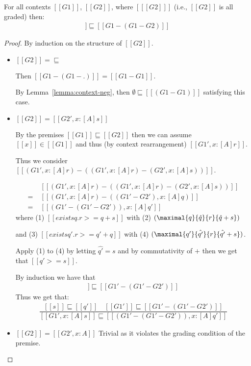 \begin{lemma}
\label{lemma:contexts-subsub}
For all contexts $[[ G1 ]]$, $[[ G2 ]]$, where
$[[ [ G2 ] ]]$ (i.e., $[[ G2 ]]$ is all graded)
then:
%
\begin{align*}
[[ G2 ]] \sqsubseteq [[ G1 - (G1 - G2) ]]
\end{align*}
\end{lemma}

\begin{proof}
By induction on the structure of $[[ G2 ]]$.

\begin{itemize}
\item $[[ G2 ]] = \sqsubseteq$

Then $[[ G1 - (G1 - .) ]] = [[ G1 - G1 ]]$.

By Lemma~\ref{lemma:context-neg}, then $ \emptyset \sqsubseteq [[ (G1 - G1) ]]$
satisfying this case.

\item $[[ G2 ]] = [[ G2', x : [A] s ]]$

By the premises $[[ G1 ]] \sqsubseteq [[ G2 ]]$ then we can
assume $[[ x ]] \in [[ G1 ]]$ and thus (by context
rearrangement) $[[ G1', x : [A] r]]$.

Thus we consider $[[ (G1', x : [A] r) - ((G1', x : [A] r) - (G2', x : [A] s)) ]]$.

\begin{align*}
  \; & [[ (G1', x : [A] r) - ((G1', x : [A] r) - (G2', x : [A] s)) ]] \\
= \; & [[ (G1', x : [A] r) - ((G1' - G2'), x : [A] q) ]] \\
= \; & [[ (G1' - (G1' - G2')), x : [A] q' ]]
\end{align*}
%
where (1) $[[ exists q . r >= q + s ]]$ with
(2) $(\maximal{q}{\hat{q}}{r}{\hat{q}+s})$

and (3) $[[ exists q' . r >= q' + q ]]$
with (4) $(\maximal{q'}{\hat{q'}}{r}{\hat{q'}+s})$.

Apply (1) to (4) by letting $\hat{q'} = {s}$
and by commutativity of $+$ then we get that
$[[q' >= s]]$.

By induction we have that
%
\begin{align*}
[[ G1' ]] \sqsubseteq [[  {G1' - (G1' - G2')} ]] \tag{ih}
\end{align*}
%
%
Thus we get that:
%
\begin{align*}
\dfrac{[[ s ]] \sqsubseteq [[ q' ]] \quad
[[ G1' ]] \sqsubseteq [[  {G1' - (G1' - G2')} ]]}
{ [[ {G1', x : [A] s} ]] \sqsubseteq [[  {(G1' - (G1' - G2')), x : [A] q'} ]] }
\end{align*}
%
\item $[[ G2 ]] = [[ G2', x : A]]$ Trivial as it violates the grading
  condition of the premise.
\end{itemize}
\end{proof}

